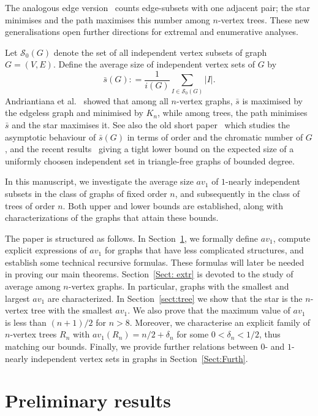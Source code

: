 \documentclass[a4paper,12pt]{amsart}
\theoremstyle{remark}
\begin{document}
The analogous edge version~\cite{shozi2024edge} counts edge-subsets with one adjacent pair; the star minimises and the path maximises this number among $n$-vertex trees. These new generalisations open further directions for extremal and enumerative analyses.

Let $\mathcal{S}_0(G)$ denote the set of all independent vertex subsets of graph $G=(V,E)$. Define the average size of independent vertex sets of $G$ by
\[
\bar{s}(G): = \frac{1}{i(G)} \sum_{I \in \mathcal{S}_0(G)} |I|.
\]
Andriantiana et al.~\cite{andriantiana2018} showed that among all $n$-vertex graphs, $\bar{s}$ is maximised by the edgeless graph and minimised by $K_n$, while among trees, the path minimises $\bar{s}$ and the star maximises it. See also the old short paper~\cite{Nilli1988AverageIndependentSets} which studies the asymptotic behaviour of $\bar{s}(G)$ in terms of order and the chromatic number of $G$,  and the recent results~\cite{Davies2018AverageIndependentSets} giving a tight lower bound on the expected size of a uniformly choosen independent set in triangle-free graphs of bounded degree.

In this manuscript, we investigate the average size $av_1$ of $1$-nearly independent subsets in the class of graphs of fixed order $n$, and subsequently in the class of trees of order $n$. Both upper and lower bounds are established, along with characterizations of the graphs that attain these bounds.

The paper is structured as follows. 
In Section~\ref{Sect:Prelim}, we formally define $av_1$, compute explicit expressions of $av_1$ for graphs that have less complicated structures, and establish some technical recursive formulas. These formulas will later be needed in proving our main theorems.
Section~\ref{Sect: extr} is devoted to the study of average among $n$-vertex graphs. In particular, graphs with the smallest and largest $av_1$ are characterized.
In Section~\ref{sect:tree} we show that the star is the $n$-vertex tree with the smallest $av_1$. We also prove that the maximum value of $av_1$ is less than $(n+1)/2$ for $n>8$. Moreover, we characterise an explicit family of $n$-vertex trees $R_n$ with $av_1(R_n)=n/2 + \delta_n$ for some $0 <\delta_n <1/2$, thus matching our bounds.
Finally, we provide further relations between $0$- and $1$-nearly independent vertex sets in graphs in Section~\ref{Sect:Furth}. 


\section{Preliminary results}\label{Sect:Prelim}
\end{document}
